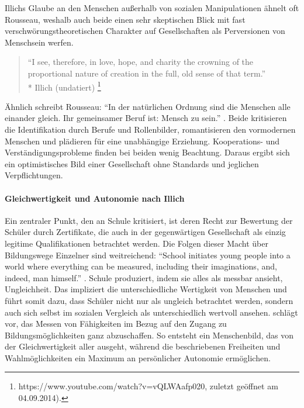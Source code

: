 Illichs Glaube an den Menschen außerhalb von sozialen Manipulationen ähnelt oft Rousseau, weshalb auch beide einen sehr skeptischen Blick mit fast verschwörungstheoretischen Charakter auf Gesellschaften als Perversionen von Menschsein werfen.

\begin{quote}
	``I see, therefore, in love, hope, and charity the crowning of the proportional nature of creation in the full, old sense of that term.''\\*
	Illich (undatiert)
	\footnote{
		https://www.youtube.com/watch?v=vQLWAafp020, zuletzt geöffnet am 04.09.2014).
	}
\end{quote}

Ähnlich schreibt Rousseau: ``In der natürlichen Ordnung sind die Menschen alle einander gleich. Ihr gemeinsamer Beruf ist: Mensch zu sein.'' \parencite[50]{rousseau-1762}.
Beide kritisieren die Identifikation durch Berufe und Rollenbilder, romantisieren den vormodernen Menschen und plädieren für eine unabhängige Erziehung.
Kooperations- und Verständigungsprobleme finden bei beiden wenig Beachtung.
Daraus ergibt sich ein optimistisches Bild einer Gesellschaft ohne Standards und jeglichen Verpflichtungen.


\paragraph{Gleichwertigkeit und Autonomie nach Illich}

Ein zentraler Punkt, den \citeauthor{Illich-1971} an Schule kritisiert, ist deren Recht zur Bewertung der Schüler durch Zertifikate, die auch in der gegenwärtigen Gesellschaft als einzig legitime Qualifikationen betrachtet werden.
Die Folgen dieser Macht über Bildungswege Einzelner sind weitreichend: ``School initiates young people into a world where everything can be measured, including their imaginations, and, indeed, man himself.'' \parencite[19]{Illich-1971}.
Schule produziert, indem sie alles als messbar ansieht, Ungleichheit.
Das impliziert die unterschiedliche Wertigkeit von Menschen und führt somit dazu, dass Schüler nicht nur als ungleich betrachtet werden, sondern auch sich selbst im sozialen Vergleich als unterschiedlich wertvoll ansehen.
\citeauthor{Illich-1971} schlägt vor, das Messen von Fähigkeiten im Bezug auf den Zugang zu Bildungsmöglichkeiten ganz abzuschaffen.
So entsteht ein Menschenbild, das von der Gleichwertigkeit aller ausgeht, während die beschriebenen Freiheiten und Wahlmöglichkeiten ein Maximum an persönlicher Autonomie ermöglichen.
